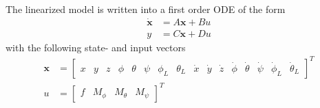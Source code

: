 %
%
%
The linearized model is written into a first order ODE of the form
\begin{align}\label{eq:app.ss}
\mathbf{\dot{x} }&=A\mathbf{x}+Bu\\
y&=C\mathbf{x}+Du
\end{align}
with the following state- and input vectors
\begin{equation}\label{key}
\begin{aligned}
\mathbf{x}&=\begin{bmatrix}
x&y&z&\phi&\theta&\psi&\phi_L&\theta_L&\dot{x}&\dot{y}&\dot{z}&\dot{\phi}&\dot{\theta}&\dot{\psi}&\dot{\phi}_L&\dot{\theta}_L
\end{bmatrix}^T\\
u&=\begin{bmatrix}
f&M_\phi&M_\theta&M_\psi
\end{bmatrix}^T
\end{aligned}
\end{equation}

